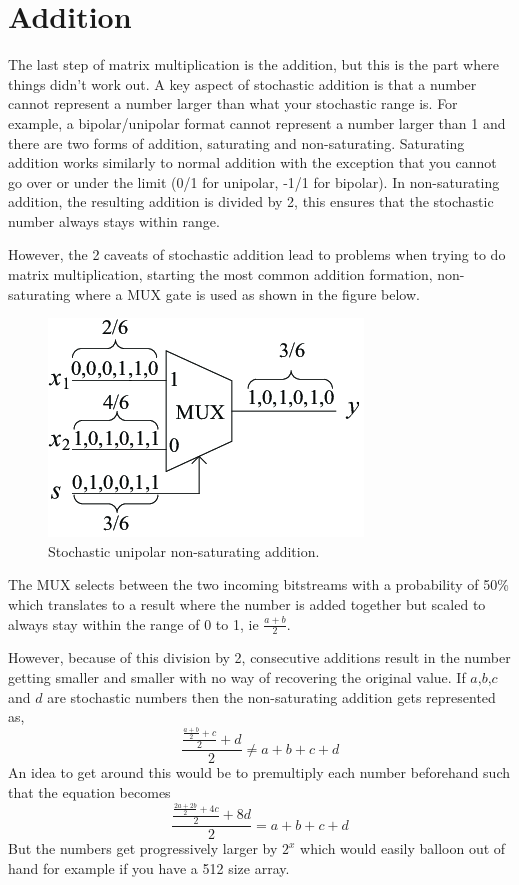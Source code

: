 \documentclass[a4paper,oneside,phd,etd]{BYUPhys}
\begin{document}
\section{Addition}
The last step of matrix multiplication is the addition, but this is the part where things didn't work out. A key aspect of stochastic addition is that a number cannot represent a number larger than what your stochastic range is. For example, a bipolar/unipolar format cannot represent a number larger than 1 and there are two forms of addition, saturating and non-saturating. Saturating addition works similarly to normal addition with the exception that you cannot go over or under the limit (0/1 for unipolar, -1/1 for bipolar). In non-saturating addition, the resulting addition is divided by 2, this ensures that the stochastic number always stays within range.

However, the 2 caveats of stochastic addition lead to problems when trying to do matrix multiplication, starting the most common addition formation, non-saturating where a MUX gate is used as shown in the figure below.
\begin{figure}[H]
\centering
\includegraphics[scale=2]{pictures/add.png}
\caption{Stochastic unipolar non-saturating addition\cite{fig:multiplyslashadd}.}
\label{fig:multiplyslashadd}
\end{figure}
The MUX selects between the two incoming bitstreams with a probability of 50\% which translates to a result where the number is added together but scaled to always stay within the range of 0 to 1, ie $\frac{a+b}{2}$.

However, because of this division by 2, consecutive additions result in the number getting smaller and smaller with no way of recovering the original value.
If $a$,$b$,$c$ and $d$ are stochastic numbers then the non-saturating addition gets represented as,
$$\frac{\frac{\frac{a+b}{2}+c}{2}+d}{2} \neq a+b+c+d$$
An idea to get around this would be to premultiply each number beforehand such that the equation becomes
$$\frac{\frac{\frac{2a+2b}{2}+4c}{2}+8d}{2} = a+b+c+d$$
But the numbers get progressively larger by $2^x$ which would easily balloon out of hand for example if you have a 512 size array.
\end{document}
